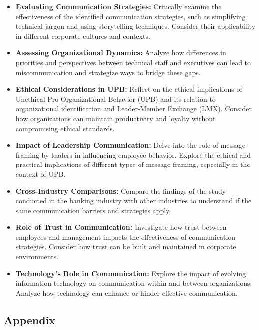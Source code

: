 \documentclass[runningheads]{llncs}
\begin{document}
\begin{itemize}
    \item \textbf{Evaluating Communication Strategies:} Critically examine the effectiveness of the identified communication strategies, such as simplifying technical jargon and using storytelling techniques. Consider their applicability in different corporate cultures and contexts.
    \item \textbf{Assessing Organizational Dynamics:} Analyze how differences in priorities and perspectives between technical staff and executives can lead to miscommunication and strategize ways to bridge these gaps.
    \item \textbf{Ethical Considerations in UPB:} Reflect on the ethical implications of Unethical Pro-Organizational Behavior (UPB) and its relation to organizational identification and Leader-Member Exchange (LMX). Consider how organizations can maintain productivity and loyalty without compromising ethical standards.
    \item \textbf{Impact of Leadership Communication:} Delve into the role of message framing by leaders in influencing employee behavior. Explore the ethical and practical implications of different types of message framing, especially in the context of UPB.
    \item \textbf{Cross-Industry Comparisons:} Compare the findings of the study conducted in the banking industry with other industries to understand if the same communication barriers and strategies apply.
    \item \textbf{Role of Trust in Communication:} Investigate how trust between employees and management impacts the effectiveness of communication strategies. Consider how trust can be built and maintained in corporate environments.
    \item \textbf{Technology's Role in Communication:} Explore the impact of evolving information technology on communication within and between organizations. Analyze how technology can enhance or hinder effective communication.
    
\end{itemize}

\subsection{Appendix}
\end{document}
